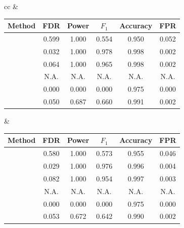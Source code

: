 ﻿\documentclass[12pt]{article}
\newcommand{\0}{\mbox{\bf 0}}
\theoremstyle{plain}%
\theoremstyle{definition}
\begin{document}
{\begin{table}[htbp]
\begin{tabular}{cc}
 &  \\
\begin{tabular}{lccccc}
\toprule
Method & FDR & Power & $F_1$ & Accuracy & FPR \\
\midrule
\sc{Lasso}         &     0.599  & 1.000  & 0.554  & 0.950  & 0.052  \\
\sc{FarmSelect}    &     0.032  & 1.000  & 0.978  & 0.998  & 0.002  \\
\sc{Model-X}       &    0.064  & 1.000  & 0.965  & 0.998  & 0.002  \\
\sc{Fixed-X}       & N.A.  & N.A.  & N.A.  & N.A.  & N.A.  \\
\sc{TSKI }         &    0.000  & 0.000  & 0.000  & 0.975  & 0.000  \\
\sc{FAR-Knockoff} & 0.050 & 0.687 & 0.660 & 0.991 & 0.002 \\

\bottomrule
\end{tabular}
&
\begin{tabular}{lccccc}
\toprule
Method & FDR & Power & $F_1$ & Accuracy & FPR \\
\midrule
\sc{Lasso}         &     0.580  & 1.000  & 0.573  & 0.955  & 0.046  \\
\sc{FarmSelect}    &    0.029  & 1.000  & 0.976  & 0.996  & 0.004  \\
\sc{Model-X}       &     0.082  & 1.000  & 0.954  & 0.997  & 0.003  \\
\sc{Fixed-X}       & N.A.  & N.A.  & N.A.  & N.A.  & N.A.  \\
\sc{TSKI}          &     0.000  & 0.000  & 0.000  & 0.975  & 0.000  \\
\sc{FAR-Knockoff} & 0.053 & 0.672 & 0.642 & 0.990 & 0.002 \\

\bottomrule
\end{tabular}
\end{tabular}
\end{table}


}
\end{document}
